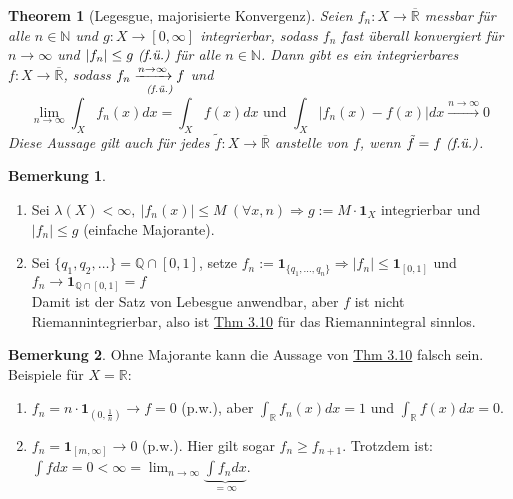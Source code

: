 \documentclass[a4paper]{report}
\newcommand{\doubleOne}{\textbf{1}}
\newcommand{\R}{\mathbb{R}}
\newcommand{\Rq}{\overline{\R}}
\newcommand{\N}{\mathbb{N}}
\newcommand{\Q}{\mathbb{Q}}
\newcommand{\toInf}{\rightarrow \infty}
\newcommand{\limToInf}[1]{\lim_{#1 \toInf}}
\newcommand{\jlabel}[1]{\label{j_#1}}
\newcommand{\jhyperref}[2]{\hyperref[j_#1]{#2}}
\newcommand{\jlink}[1]{\jhyperref{#1}{#1}}
\newcommand{\fu}{\text{\textit{(f.ü.)}}}
\newcommand{\jabb}[3]{ #1: #2 \rightarrow #3 }
\theoremstyle{plain}
\newtheorem{thm}{Theorem}[chapter]
\theoremstyle{definition}
\newtheorem{bem}[thm]{Bemerkung}
\newtheorem*{bem*}{Bemerkung}
\begin{document}
{{{{\begin{thm}[Legesgue, majorisierte Konvergenz]
\jlabel{Thm 3.10}
    Seien $\jabb{f_n}{X}{\Rq}$ messbar für alle $n\in\N$ und $\jabb{g}{X}{[0,\infty]}$ integrierbar, sodass $f_n$ fast überall konvergiert für $n\rightarrow \infty$ und $|f_n| \le g \ \fu$ für alle $n\in\N$. Dann gibt es ein integrierbares $\jabb{f}{X}{\Rq}$, sodass $f_n \underset{\fu}{\xrightarrow{n\rightarrow \infty} f}$ und
    \begin{displaymath}
        \limToInf{n} \int_X f_n(x)dx = \int_X f(x) dx \text{ und } \int_X |f_n(x)-f(x)|dx \xrightarrow{n\rightarrow \infty} 0
    \end{displaymath}
    Diese Aussage gilt auch für jedes $\jabb{\tilde{f}}{X}{\Rq}$ anstelle von $f$, wenn $\tilde{f} = f \ \fu$.
\end{thm}

\begin{bem*}
    \begin{enumerate}
        \item Sei $\lambda(X) < \infty, \ |f_n(x)| \le M \ (\forall x, n) \Rightarrow g:= M\cdot \doubleOne_X$ integrierbar und $|f_n| \le g$ (einfache Majorante).
        \item Sei $\{q_1, q_2,\dots\} = \Q \cap [0,1]$, setze $f_n := \doubleOne_{\{q_1, \dots, q_n\}} \Rightarrow |f_n| \le \doubleOne_{[0,1]}$ und $f_n \rightarrow \doubleOne_{\Q \cap [0,1]} = f$\\
        Damit ist der Satz von Lebesgue anwendbar, aber $f$ ist nicht Riemannintegrierbar, also ist \jlink{Thm 3.10} für das Riemannintegral sinnlos.
    \end{enumerate}

\end{bem*}


\begin{bem}
\jlabel{Bem 3.11}
    Ohne Majorante kann die Aussage von \jlink{Thm 3.10} falsch sein. Beispiele für $X = \R$:
    \begin{enumerate}
        \item 
            $f_n = n\cdot \doubleOne_{(0, \frac{1}{n})} \rightarrow f = 0$ (p.w.), aber $\int_\R f_n(x) dx = 1$ und $\int_\R f(x)dx = 0$.
            
        \item
            $f_n = \doubleOne_{[m, \infty]} \rightarrow 0$ (p.w.). Hier gilt sogar $f_n \ge f_{n+1}$. Trotzdem ist: \\
            $\int f dx = 0 < \infty = \limToInf{n} \underbrace{\int f_n dx}_{=\infty}$.
    \end{enumerate}


\end{bem}}}}}
\end{document}
